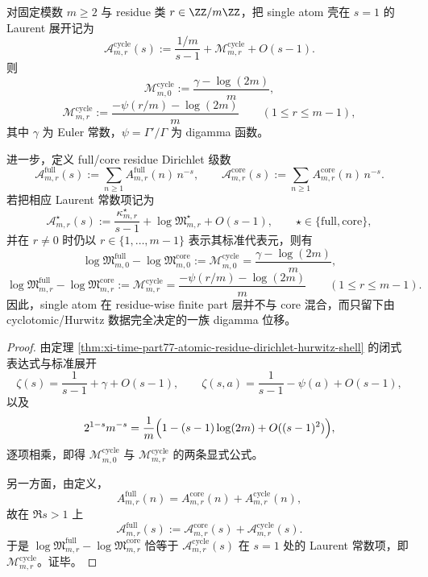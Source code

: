 \begin{corollary}\label{cor:xi-time-part77-atomic-residue-finitepart-digamma-shift}
对固定模数 \(m\ge 2\) 与 residue 类 \(r\in \ZZ/m\ZZ\)，把 single atom 壳在 \(s=1\) 的 Laurent 展开记为
\[
\mathcal A^{\mathrm{cycle}}_{m,r}(s)
:=
\frac{1/m}{s-1}
+\mathcal M^{\mathrm{cycle}}_{m,r}
+O(s-1).
\]
则
\[
\mathcal M^{\mathrm{cycle}}_{m,0}
:=
\frac{\gamma-\log(2m)}{m},
\]
\[
\mathcal M^{\mathrm{cycle}}_{m,r}
:=
\frac{-\psi(r/m)-\log(2m)}{m}
\qquad (1\le r\le m-1),
\]
其中 \(\gamma\) 为 Euler 常数，\(\psi=\Gamma'/\Gamma\) 为 digamma 函数。

进一步，定义 full/core residue Dirichlet 级数
\[
\mathcal A^{\mathrm{full}}_{m,r}(s)
:=
\sum_{n\ge 1}A^{\mathrm{full}}_{m,r}(n)\,n^{-s},
\qquad
\mathcal A^{\mathrm{core}}_{m,r}(s)
:=
\sum_{n\ge 1}A^{\mathrm{core}}_{m,r}(n)\,n^{-s}.
\]
若把相应 Laurent 常数项记为
\[
\mathcal A^{\star}_{m,r}(s)
:=
\frac{\kappa^{\star}_{m,r}}{s-1}
+\log\mathfrak M^{\star}_{m,r}
+O(s-1),
\qquad
\star\in\{\mathrm{full},\mathrm{core}\},
\]
并在 \(r\neq 0\) 时仍以 \(r\in\{1,\dots,m-1\}\) 表示其标准代表元，则有
\[
\log\mathfrak M^{\mathrm{full}}_{m,0}
-\log\mathfrak M^{\mathrm{core}}_{m,0}
:=
\mathcal M^{\mathrm{cycle}}_{m,0}
=
\frac{\gamma-\log(2m)}{m},
\]
\[
\log\mathfrak M^{\mathrm{full}}_{m,r}
-\log\mathfrak M^{\mathrm{core}}_{m,r}
:=
\mathcal M^{\mathrm{cycle}}_{m,r}
=
\frac{-\psi(r/m)-\log(2m)}{m}
\qquad (1\le r\le m-1).
\]
因此，single atom 在 residue-wise finite part 层并不与 core 混合，而只留下由 cyclotomic/Hurwitz 数据完全决定的一族 digamma 位移。
\end{corollary}
\begin{proof}
由定理 \ref{thm:xi-time-part77-atomic-residue-dirichlet-hurwitz-shell} 的闭式表达式与标准展开
\[
\zeta(s)=\frac{1}{s-1}+\gamma+O(s-1),
\qquad
\zeta(s,a)=\frac{1}{s-1}-\psi(a)+O(s-1),
\]
以及
\[
2^{1-s}m^{-s}
=
\frac{1}{m}\Bigl(1-(s-1)\log(2m)+O((s-1)^2)\Bigr),
\]
逐项相乘，即得 \(\mathcal M^{\mathrm{cycle}}_{m,0}\) 与 \(\mathcal M^{\mathrm{cycle}}_{m,r}\) 的两条显式公式。

另一方面，由定义，
\[
A^{\mathrm{full}}_{m,r}(n)=A^{\mathrm{core}}_{m,r}(n)+A^{\mathrm{cycle}}_{m,r}(n),
\]
故在 \(\Re s>1\) 上
\[
\mathcal A^{\mathrm{full}}_{m,r}(s)
:=
\mathcal A^{\mathrm{core}}_{m,r}(s)+\mathcal A^{\mathrm{cycle}}_{m,r}(s).
\]
于是 \(\log\mathfrak M^{\mathrm{full}}_{m,r}-\log\mathfrak M^{\mathrm{core}}_{m,r}\) 恰等于 \(\mathcal A^{\mathrm{cycle}}_{m,r}(s)\) 在 \(s=1\) 处的 Laurent 常数项，即 \(\mathcal M^{\mathrm{cycle}}_{m,r}\)。证毕。
\end{proof}

